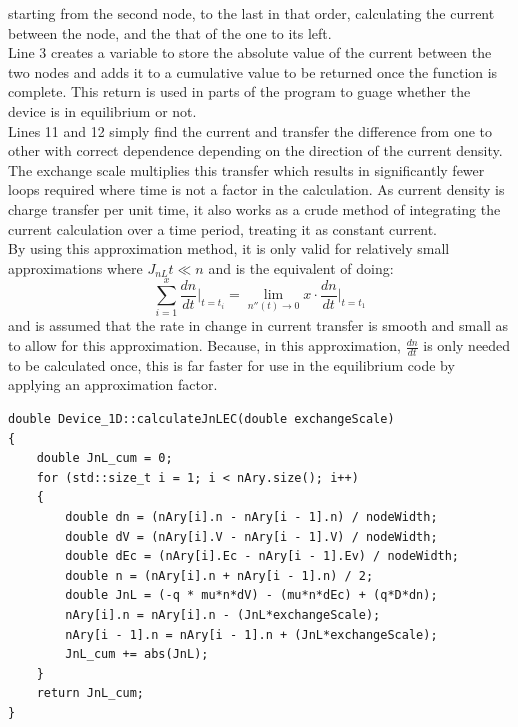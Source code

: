 \documentclass[titlepage]{article}
\begin{document}
starting from the second node, to the last in that order, calculating the current between the node, and the that of the one to its left.\\
Line 3 creates a variable to store the absolute value of the current between the two nodes and adds it to a cumulative value to be returned once the function is complete. This return is used in parts of the program to guage whether the device is in equilibrium or not.\\
Lines 11 and 12 simply find the current and transfer the difference from one to other with correct dependence depending on the direction of the current density.\\
The exchange scale multiplies this transfer which results in significantly fewer loops required where time is not a factor in the calculation. As current density is charge transfer per unit time, it also works as a crude method of integrating the current calculation over a time period, treating it as constant current.\\
By using this approximation method, it is only valid for relatively small approximations where $J_{nL} t \ll n$ and is the equivalent of doing:
\begin{equation}
 \sum\limits_{i=1}^{x}\dfrac{dn}{dt}\Big|_{t=t_i} = \lim\limits_{n''(t)\to 0} x\cdot \dfrac{dn}{dt}\Big|_{t=t_1}  
\end{equation}
and is assumed that the rate in change in current transfer is smooth and small as to allow for this approximation. Because, in this approximation, $\frac{dn}{dt}$ is only needed to be calculated once, this is far faster for use in the equilibrium code by applying an approximation factor.
\begin{lstlisting}[caption = Example of the current calculation algorithm]
double Device_1D::calculateJnLEC(double exchangeScale)
{
	double JnL_cum = 0;	
	for (std::size_t i = 1; i < nAry.size(); i++)
	{
		double dn = (nAry[i].n - nAry[i - 1].n) / nodeWidth;
		double dV = (nAry[i].V - nAry[i - 1].V) / nodeWidth;
		double dEc = (nAry[i].Ec - nAry[i - 1].Ev) / nodeWidth;
		double n = (nAry[i].n + nAry[i - 1].n) / 2;
		double JnL = (-q * mu*n*dV) - (mu*n*dEc) + (q*D*dn);
		nAry[i].n = nAry[i].n - (JnL*exchangeScale);
		nAry[i - 1].n = nAry[i - 1].n + (JnL*exchangeScale);
		JnL_cum += abs(JnL);
	}
	return JnL_cum;
}
\end{lstlisting}
\end{document}
